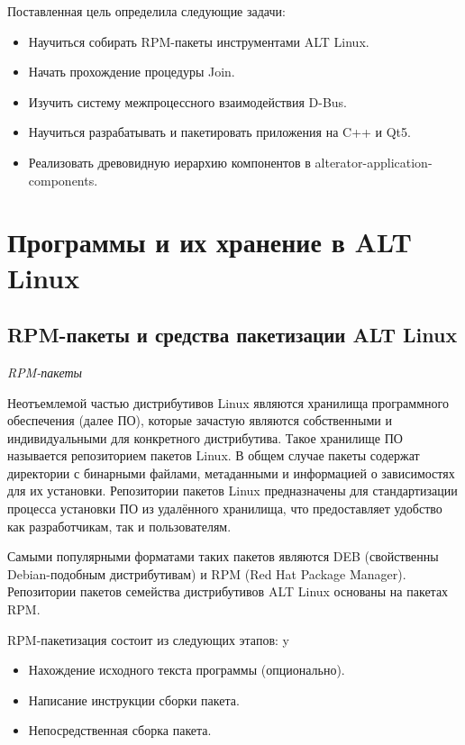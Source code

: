 \documentclass[bachelor, och, pract]{SCWorks}
\begin{document}
Поставленная цель определила следующие задачи:
\begin{itemize}
    \item Научиться собирать RPM-пакеты инструментами ALT Linux.
    \item Начать прохождение процедуры Join.
    \item Изучить систему межпроцессного взаимодействия D-Bus.
    \item Научиться разрабатывать и пакетировать приложения на C++ и Qt5.
    \item Реализовать древовидную иерархию компонентов в alterator-application-components.
\end{itemize}

\section{Программы и их хранение в ALT Linux} %

\subsection{RPM-пакеты и средства пакетизации ALT Linux}

\textit{RPM-пакеты}

Неотъемлемой частью дистрибутивов Linux являются хранилища программного обеспечения (далее ПО), которые зачастую являются собственными и индивидуальными для конкретного дистрибутива.
Такое хранилище ПО называется репозиторием пакетов Linux.
В общем случае пакеты содержат директории с бинарными файлами, метаданными и информацией о зависимостях для их установки.
Репозитории пакетов Linux предназначены для стандартизации процесса установки ПО из удалённого хранилища, что предоставляет удобство как разработчикам, так и пользователям.

Самыми популярными форматами таких пакетов являются DEB (свойственны Debian-подобным дистрибутивам) и RPM (Red Hat Package Manager).
Репозитории пакетов семейства дистрибутивов ALT Linux основаны на пакетах RPM.

RPM-пакетизация состоит из следующих этапов:
y\begin{itemize}                                                                           
    \item Нахождение исходного текста программы (опционально).                           
    \item Написание инструкции сборки пакета.                                              
    \item Непосредственная сборка пакета.                            
\end{itemize}
\end{document}
